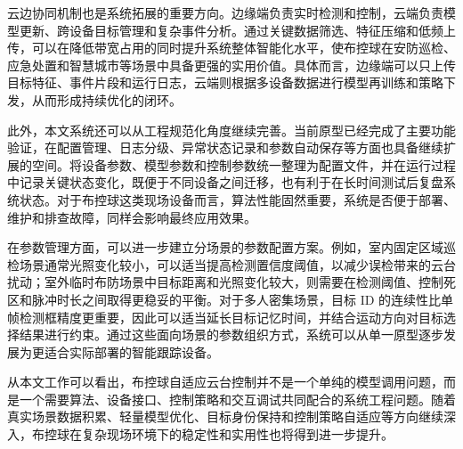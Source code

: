 云边协同机制也是系统拓展的重要方向。边缘端负责实时检测和控制，云端负责模型更新、跨设备目标管理和复杂事件分析。通过关键数据筛选、特征压缩和低频上传，可以在降低带宽占用的同时提升系统整体智能化水平，使布控球在安防巡检、应急处置和智慧城市等场景中具备更强的实用价值。具体而言，边缘端可以只上传目标特征、事件片段和运行日志，云端则根据多设备数据进行模型再训练和策略下发，从而形成持续优化的闭环。

此外，本文系统还可以从工程规范化角度继续完善。当前原型已经完成了主要功能验证，在配置管理、日志分级、异常状态记录和参数自动保存等方面也具备继续扩展的空间。将设备参数、模型参数和控制参数统一整理为配置文件，并在运行过程中记录关键状态变化，既便于不同设备之间迁移，也有利于在长时间测试后复盘系统状态。对于布控球这类现场设备而言，算法性能固然重要，系统是否便于部署、维护和排查故障，同样会影响最终应用效果。

在参数管理方面，可以进一步建立分场景的参数配置方案。例如，室内固定区域巡检场景通常光照变化较小，可以适当提高检测置信度阈值，以减少误检带来的云台扰动；室外临时布防场景中目标距离和光照变化较大，则需要在检测阈值、控制死区和脉冲时长之间取得更稳妥的平衡。对于多人密集场景，目标 ID 的连续性比单帧检测框精度更重要，因此可以适当延长目标记忆时间，并结合运动方向对目标选择结果进行约束。通过这些面向场景的参数组织方式，系统可以从单一原型逐步发展为更适合实际部署的智能跟踪设备。

从本文工作可以看出，布控球自适应云台控制并不是一个单纯的模型调用问题，而是一个需要算法、设备接口、控制策略和交互调试共同配合的系统工程问题。随着真实场景数据积累、轻量模型优化、目标身份保持和控制策略自适应等方向继续深入，布控球在复杂现场环境下的稳定性和实用性也将得到进一步提升。
